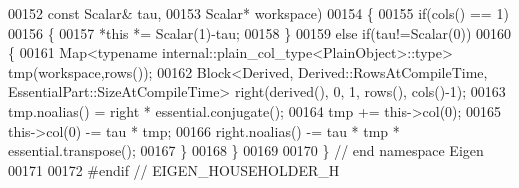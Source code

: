 \begin{DoxyCode}
00152   \textcolor{keyword}{const} Scalar& tau,
00153   Scalar* workspace)
00154 \{
00155   \textcolor{keywordflow}{if}(cols() == 1)
00156   \{
00157     *\textcolor{keyword}{this} *= Scalar(1)-tau;
00158   \}
00159   \textcolor{keywordflow}{else} \textcolor{keywordflow}{if}(tau!=Scalar(0))
00160   \{
00161     Map<typename internal::plain\_col\_type<PlainObject>::type> tmp(workspace,rows());
00162     Block<Derived, Derived::RowsAtCompileTime, EssentialPart::SizeAtCompileTime> right(derived(), 0, 1, 
      rows(), cols()-1);
00163     tmp.noalias() = right * essential.conjugate();
00164     tmp += this->col(0);
00165     this->col(0) -= tau * tmp;
00166     right.noalias() -= tau * tmp * essential.transpose();
00167   \}
00168 \}
00169 
00170 \} \textcolor{comment}{// end namespace Eigen}
00171 
00172 \textcolor{preprocessor}{#endif // EIGEN\_HOUSEHOLDER\_H}
\end{DoxyCode}
